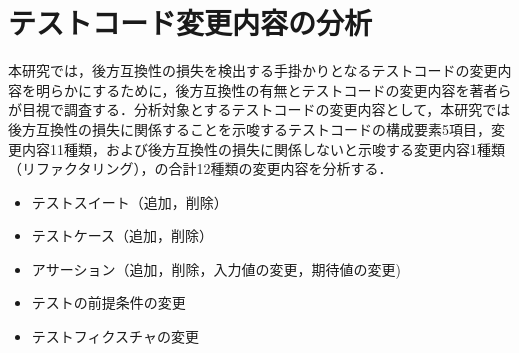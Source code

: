 \documentclass[submit]{ipsj}
\begin{document}



\section{テストコード変更内容の分析}\label{sec:contentAnalysis}

本研究では，後方互換性の損失を検出する手掛かりとなるテストコードの変更内容を明らかにするために，後方互換性の有無とテストコードの変更内容を著者らが目視で調査する．分析対象とするテストコードの変更内容として，本研究では後方互換性の損失に関係することを示唆するテストコードの構成要素5項目，変更内容11種類，および後方互換性の損失に関係しないと示唆する変更内容1種類（リファクタリング），の合計12種類の変更内容を分析する．

\begin{itemize}
  \setlength{\itemsep}{0cm}
  \item テストスイート（追加，削除）
  \item テストケース（追加，削除）
  \item アサーション（追加，削除，入力値の変更，期待値の変更)
  \item テストの前提条件の変更
  \item テストフィクスチャの変更
\end{itemize}
\end{document}
